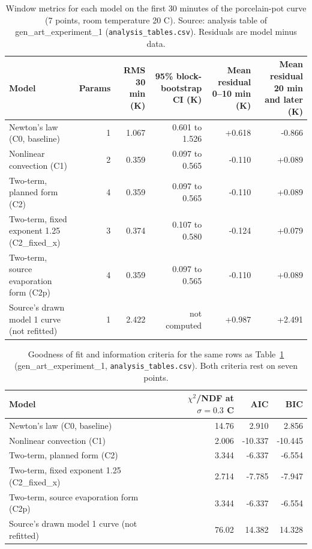 \documentclass[11pt,letterpaper]{article}
\begin{document}
\begin{table}[!htbp]
\centering
\small
\caption{Window metrics for each model on the first 30 minutes of the porcelain-pot curve (7 points, room temperature 20 C). Source: analysis table of gen\_art\_experiment\_1 (\texttt{analysis\_tables.csv}). Residuals are model minus data.}
\label{tab:it1-window}
\begin{tabularx}{\linewidth}{Xrrrrr}
\toprule
Model & Params & RMS 30 min (K) & 95\% block-bootstrap CI (K) & Mean residual 0--10 min (K) & Mean residual 20 min and later (K) \\
\midrule
Newton's law (C0, baseline) & 1 & 1.067 & 0.601 to 1.526 & +0.618 & -0.866 \\
Nonlinear convection (C1) & 2 & 0.359 & 0.097 to 0.565 & -0.110 & +0.089 \\
Two-term, planned form (C2) & 4 & 0.359 & 0.097 to 0.565 & -0.110 & +0.089 \\
Two-term, fixed exponent 1.25 (C2\_fixed\_x) & 3 & 0.374 & 0.107 to 0.580 & -0.124 & +0.079 \\
Two-term, source evaporation form (C2p) & 4 & 0.359 & 0.097 to 0.565 & -0.110 & +0.089 \\
Source's drawn model 1 curve (not refitted) & 1 & 2.422 & not computed & +0.987 & +2.491 \\
\bottomrule
\end{tabularx}
\end{table}

\begin{table}[!htbp]
\centering
\small
\caption{Goodness of fit and information criteria for the same rows as Table~\ref{tab:it1-window} (gen\_art\_experiment\_1, \texttt{analysis\_tables.csv}). Both criteria rest on seven points.}
\label{tab:it1-window-b}
\begin{tabularx}{\linewidth}{Xrrr}
\toprule
Model & $\chi^2$/NDF at $\sigma = 0.3$ C & AIC & BIC \\
\midrule
Newton's law (C0, baseline) & 14.76 & 2.910 & 2.856 \\
Nonlinear convection (C1) & 2.006 & -10.337 & -10.445 \\
Two-term, planned form (C2) & 3.344 & -6.337 & -6.554 \\
Two-term, fixed exponent 1.25 (C2\_fixed\_x) & 2.714 & -7.785 & -7.947 \\
Two-term, source evaporation form (C2p) & 3.344 & -6.337 & -6.554 \\
Source's drawn model 1 curve (not refitted) & 76.02 & 14.382 & 14.328 \\
\bottomrule
\end{tabularx}
\end{table}
\end{document}
